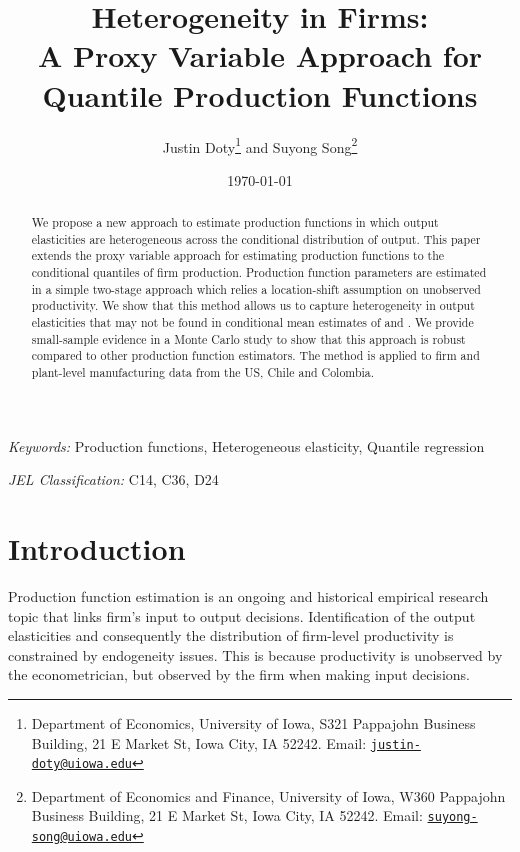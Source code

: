 \documentclass[11pt]{article}
\begin{document}
\title{Heterogeneity in Firms: \\
A Proxy Variable Approach for Quantile Production Functions
}

\author{Justin Doty\thanks{Department of Economics, University of Iowa, S321 Pappajohn Business Building, 21 E Market St, Iowa City, IA 52242. Email: \href{mailto:justin-doty@uiowa.edu}{\texttt{justin-doty@uiowa.edu}}} and Suyong Song\thanks{Department of Economics and Finance, University of Iowa, W360 Pappajohn Business Building, 21 E Market St, Iowa City, IA 52242. Email: \href{mailto:suyong-song@uiowa.edu}{\texttt{suyong-song@uiowa.edu}}}
}

\date {\today}
\maketitle


\begin{abstract}
We propose a new approach to estimate production functions in which output elasticities are heterogeneous across the conditional distribution of output. 
This paper extends the proxy variable approach for estimating production functions to the conditional quantiles of firm production. Production function parameters are estimated in a simple two-stage approach which relies a location-shift assumption on unobserved productivity. We show that this method allows us to capture heterogeneity in output elasticities that may not be found in conditional mean estimates of \cite{Levinsohn2003} and \cite{Ackerberg2015}. We provide small-sample evidence in a Monte Carlo study to show that this approach is robust compared to other production function estimators. The method is applied to firm and plant-level manufacturing data from the US, Chile and Colombia.
\end{abstract}


\textit{Keywords:} Production functions, Heterogeneous elasticity, Quantile regression

\textit{JEL Classification:} C14, C36, D24



\baselineskip25pt

\onehalfspacing

\section{Introduction}

Production function estimation is an ongoing and historical empirical research topic that links firm's input to output decisions. Identification of the output elasticities and consequently the distribution of firm-level productivity is constrained by endogeneity issues. This is because productivity is unobserved by the econometrician, but observed by the firm when making input decisions. 
\end{document}
